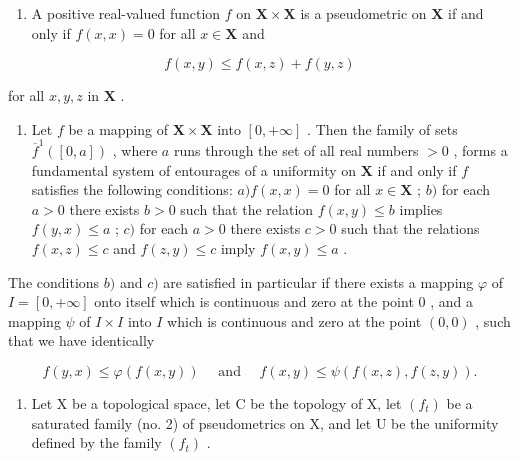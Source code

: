 \ExerciseGroupsStart
\ExerciseSection

\begin{enumerate}
\def\labelenumi{\arabic{enumi})}
\tightlist
\item
  A positive real-valued function \(f\) on \(\mathbf{X} \times \mathbf{X}\) is a pseudometric on \(\mathbf{X}\) if and only if \(f(x, x) = 0\) for all \(x \in \mathbf{X}\) and
\end{enumerate}

\[
f (x, y) \leqslant f (x, z) + f (y, z)
\]

for all \(x, y, z\) in \(\mathbf{X}\) .

\begin{enumerate}
\def\labelenumi{\arabic{enumi})}
\setcounter{enumi}{1}
\tightlist
\item
  Let \(f\) be a mapping of \(\mathbf{X} \times \mathbf{X}\) into \([0, +\infty]\) . Then the family of sets \(\overline{f}^{1}([0, a])\) , where \(a\) runs through the set of all real numbers \(>0\) , forms a fundamental system of entourages of a uniformity on \(\mathbf{X}\) if and only if \(f\) satisfies the following conditions: \(a) f(x, x) = 0\) for all \(x \in \mathbf{X}\) ; \(b)\) for each \(a > 0\) there exists \(b > 0\) such that the relation \(f(x, y) \leqslant b\) implies \(f(y, x) \leqslant a\) ; \(c)\) for each \(a > 0\) there exists \(c > 0\) such that the relations \(f(x, z) \leqslant c\) and \(f(z, y) \leqslant c\) imply \(f(x, y) \leqslant a\) .
\end{enumerate}

The conditions \(b)\) and \(c)\) are satisfied in particular if there exists a mapping \(\varphi\) of \(I = [0, +\infty]\) onto itself which is continuous and zero at the point \(0\) , and a mapping \(\psi\) of \(I \times I\) into \(I\) which is continuous and zero at the point \((0, 0)\) , such that we have identically

\[
f (y, x) \leqslant \varphi (f (x, y)) \quad \text { and } \quad f (x, y) \leqslant \psi (f (x, z), f (z, y)).
\]

\begin{enumerate}
\def\labelenumi{\arabic{enumi})}
\setcounter{enumi}{2}
\tightlist
\item
  Let X be a topological space, let C be the topology of X, let \((f_{t})\) be a saturated family (no. 2) of pseudometrics on X, and let U be the uniformity defined by the family \((f_{t})\) .
\end{enumerate}

